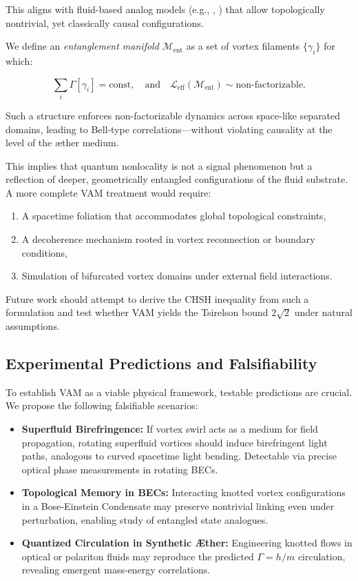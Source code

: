 This aligns with fluid-based analog models (e.g., \cite{volovik2003universe}, \cite{kiehn2005topological}) that allow topologically nontrivial, yet classically causal configurations.

We define an \textit{entanglement manifold} $\mathcal{M}_\text{ent}$ as a set of vortex filaments $\{\gamma_i\}$ for which:

\begin{equation}
    \sum_i \Gamma[\gamma_i] = \text{const}, \quad \text{and} \quad \mathcal{L}_\text{eff}(\mathcal{M}_\text{ent}) \sim \text{non-factorizable}.
\end{equation}

Such a structure enforces non-factorizable dynamics across space-like separated domains, leading to Bell-type correlations—without violating causality at the level of the æther medium.

This implies that quantum nonlocality is not a signal phenomenon but a reflection of deeper, geometrically entangled configurations of the fluid substrate. A more complete VAM treatment would require:
\begin{enumerate}
    \item A spacetime foliation that accommodates global topological constraints,
    \item A decoherence mechanism rooted in vortex reconnection or boundary conditions,
    \item Simulation of bifurcated vortex domains under external field interactions.
\end{enumerate}

Future work should attempt to derive the CHSH inequality from such a formulation and test whether VAM yields the Tsirelson bound \( 2\sqrt{2} \) under natural assumptions.

\subsection{Experimental Predictions and Falsifiability}
\label{sec:experiments}

To establish VAM as a viable physical framework, testable predictions are crucial. We propose the following falsifiable scenarios:

\begin{itemize}
    \item \textbf{Superfluid Birefringence:} If vortex swirl acts as a medium for field propagation, rotating superfluid vortices should induce birefringent light paths, analogous to curved spacetime light bending. Detectable via precise optical phase measurements in rotating BECs.

    \item \textbf{Topological Memory in BECs:} Interacting knotted vortex configurations in a Bose-Einstein Condensate may preserve nontrivial linking even under perturbation, enabling study of entangled state analogues.

    \item \textbf{Quantized Circulation in Synthetic Æther:} Engineering knotted flows in optical or polariton fluids may reproduce the predicted \( \Gamma = h/m \) circulation, revealing emergent mass-energy correlations.
\end{itemize}

